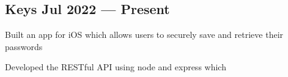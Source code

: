 \subsection{{Keys \hfill Jul 2022 --- Present}}
\begin{zitemize}
\item Built an app for iOS which allows users to securely save and retrieve their passwords
\item Developed the RESTful API using node and express which 

\end{zitemize}